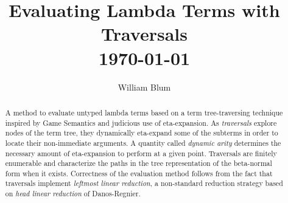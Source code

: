 \documentclass{elsarticle}
\author{William Blum}
\title{Evaluating Lambda Terms with Traversals
\\ \vspace*{1em}
\today}
\makeatletter
\theoremstyle{plain}
\theoremstyle{definition}
\def\etal{\textit{et al.}\@\xspace}
\makeatother
\begin{document}





\begin{abstract}
    A method to evaluate untyped lambda terms based on a term tree-traversing technique inspired by Game Semantics and
    judicious use of eta-expansion.
    As \emph{traversals} explore nodes of the term tree,
    they
    dynamically eta-expand
    some of the subterms
     in order to locate their non-immediate arguments.
    A quantity called \emph{dynamic arity} determines the necessary amount of
    eta-expansion to perform at a given point.
    Traversals are finitely enumerable and characterize the paths in the tree representation of the beta-normal form when it exists.
    Correctness of the evaluation method follows from
    the fact that traversals implement \emph{leftmost linear reduction}, a non-standard reduction strategy based on \emph{head linear reduction} of Danos-Regnier.
\end{abstract}
\end{document}
